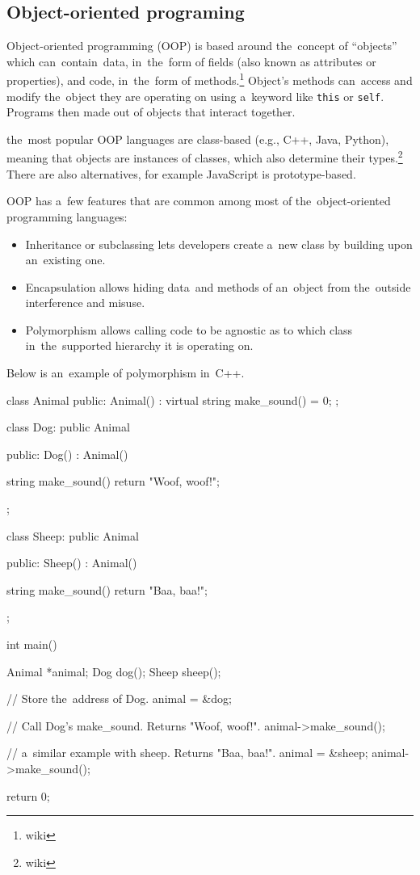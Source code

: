 \subsection{Object-oriented programing}
Object-oriented programming (OOP) is based around the~concept of ``objects'' which can~contain~data, in~the~form of fields (also known as attributes or properties),
and code, in~the~form of methods.\footnote{wiki} Object's methods can~access and modify the~object they are operating on using a~keyword like \texttt{this}
or \texttt{self}. Programs then made out of objects that interact together.

the~most popular OOP languages are class-based (e.g., C++, Java, Python), meaning that objects are instances of classes, which also determine their types.\footnote{wiki}
There are also alternatives, for example JavaScript is prototype-based.

OOP has a~few features that are common among most of the~object-oriented programming languages:
\begin{itemize}
    \item Inheritance or subclassing lets developers create a~new class by building upon an~existing one.
    \item Encapsulation allows hiding data~and methods of an~object from the~outside interference and misuse.
    \item Polymorphism allows calling code to be agnostic as to which class in~the~supported hierarchy it is operating on.
\end{itemize}

Below is an~example of polymorphism in~C++.
\begin{code}
class Animal {
public:
    Animal() : { }
    virtual string make_sound() = 0;
};

class Dog: public Animal {
public:
    Dog() : Animal() { }
      
    string make_sound() { 
        return "Woof, woof!"; 
    }
};

class Sheep: public Animal {
public:
    Sheep() : Animal() { }
      
    string make_sound() { 
        return "Baa, baa!"; 
    }
};

int main() {
    Animal *animal;
    Dog dog();
    Sheep sheep();

    // Store the~address of Dog.
    animal = &dog;

    // Call Dog's make_sound. Returns "Woof, woof!".
    animal->make_sound();

    // a~similar example with sheep. Returns "Baa, baa!".
    animal = &sheep;
    animal->make_sound();

    return 0;
}
\end{code}

